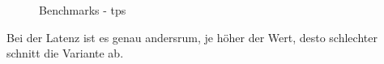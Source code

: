 \begin{flushleft}
    \begin{figure}[H]
        \centering
        \qquad
        \caption{Benchmarks - tps}
        \label{fig:tps_varianten}
    \end{figure}
    Bei der Latenz ist es genau andersrum, je höher der Wert, desto schlechter schnitt die Variante ab.
%


\end{flushleft}
